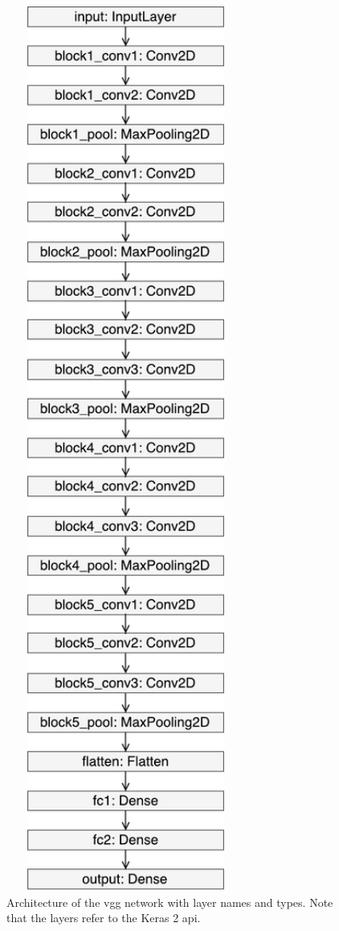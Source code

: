 \begin{figure}
\begin{minipage}{0.4\textwidth}
            \includegraphics[width=0.7\textwidth]{fig/vgg_keras.pdf}
            \caption{Architecture of the \acrshort{vgg} network with layer names and types. Note that the layers refer to the Keras 2 \acrshort{api}.}
            \label{fig:vgg-architecture}
    \end{minipage}
\end{figure}

